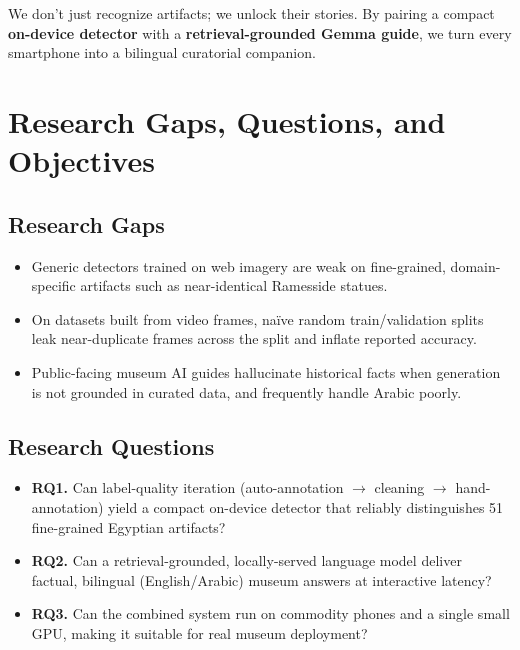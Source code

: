 \begin{insightbox}
We don't just recognize artifacts; we unlock their stories. By pairing a compact
\textbf{on-device detector} with a \textbf{retrieval-grounded Gemma guide}, we turn
every smartphone into a bilingual curatorial companion.
\end{insightbox}

\section{Research Gaps, Questions, and Objectives}

\subsection{Research Gaps}
\begin{itemize}[leftmargin=1.5em]
  \item Generic detectors trained on web imagery are weak on fine-grained,
        domain-specific artifacts such as near-identical Ramesside statues.
  \item On datasets built from video frames, naïve random train/validation splits
        leak near-duplicate frames across the split and inflate reported accuracy.
  \item Public-facing museum AI guides hallucinate historical facts when generation
        is not grounded in curated data, and frequently handle Arabic poorly.
\end{itemize}

\subsection{Research Questions}
\begin{itemize}[leftmargin=1.5em]
  \item \textbf{RQ1.} Can label-quality iteration (auto-annotation $\rightarrow$
        cleaning $\rightarrow$ hand-annotation) yield a compact on-device detector
        that reliably distinguishes 51 fine-grained Egyptian artifacts?
  \item \textbf{RQ2.} Can a retrieval-grounded, locally-served language model deliver
        factual, bilingual (English/Arabic) museum answers at interactive latency?
  \item \textbf{RQ3.} Can the combined system run on commodity phones and a single
        small GPU, making it suitable for real museum deployment?
\end{itemize}

